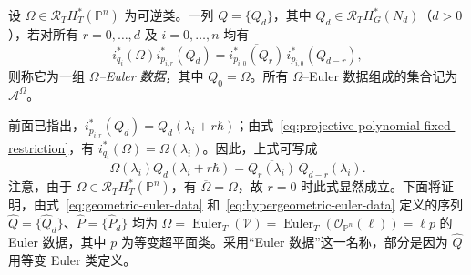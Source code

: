 \begin{definition}\label{def:omega-euler-data}
设 $\Omega\in\mathcal R_TH_T^*(\mathbb P^n)$ 为可逆类。一列 $Q=\{Q_d\}$，其中 $Q_d\in\mathcal R_TH_G^*(N_d)$（$d>0$），若对所有 $r=0,\ldots,d$ 及 $i=0,\ldots,n$ 均有
\[
i_{q_i}^*(\Omega)i_{p_{i,r}}^*(Q_d)
=\overline{i_{p_{i,0}}^*(Q_r)}\,i_{p_{i,0}}^*(Q_{d-r}),
\]
则称它为一组 \emph{$\Omega$--Euler 数据}，其中 $Q_0=\Omega$。所有 $\Omega$--Euler 数据组成的集合记为 $\mathcal A^\Omega$。
\end{definition}
前面已指出，$i_{p_{i,r}}^*(Q_d)=Q_d(\lambda_i+r\hbar)$；由式~\eqref{eq:projective-polynomial-fixed-restriction}，有 $i_{q_i}^*(\Omega)=\Omega(\lambda_i)$。因此，上式可写成
\[
\Omega(\lambda_i)Q_d(\lambda_i+r\hbar)
=\overline{Q_r(\lambda_i)}\,Q_{d-r}(\lambda_i).
\]
注意，由于 $\Omega\in\mathcal R_TH_T^*(\mathbb P^n)$，有 $\overline\Omega=\Omega$，故 $r=0$ 时此式显然成立。下面将证明，由式~\eqref{eq:geometric-euler-data} 和~\eqref{eq:hypergeometric-euler-data} 定义的序列 $\widehat Q=\{\widehat Q_d\}$、$\widehat P=\{\widehat P_d\}$ 均为 $\Omega=\operatorname{Euler}_T(\mathcal V)=\operatorname{Euler}_T(\mathcal O_{\mathbb P^n}(\ell))=\ell p$ 的 Euler 数据，其中 $p$ 为等变超平面类。采用“Euler 数据”这一名称，部分是因为 $\widehat Q$ 用等变 Euler 类定义。

